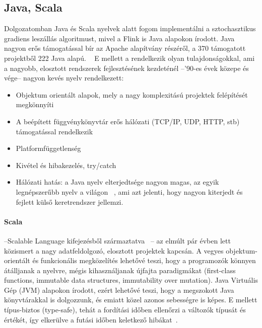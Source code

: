 \documentclass[a4paper,12pt]{article}
\begin{document}
\subsection{Java, Scala}
Dolgozatomban Java és Scala nyelvek alatt fogom implementálni a sztochasztikus gradiens leszállás algoritmust, mivel a Flink is Java alapokon írodott. Java nagyon erős támogatással bír az Apache alapítvány részéről, a 370 támogatott projektből 222 Java alapú. ~\cite{asf} E mellett a rendelkezik olyan tulajdonságokkal, ami a nagyobb, elosztott rendszerek fejlesztésének kezdeténél --'90-es évek közepe és vége-- nagyon kevés nyelv rendelkezett:
\begin{itemize}
\item Objektum orientált alapok, mely a nagy komplexitású projektek felépítését megkönnyíti
\item A beépített függvénykönyvtár erős hálózati (TCP/IP, UDP, HTTP, stb) támogatással rendelkezik
\item Platformfüggetlenség
\item Kivétel és hibakezelés, try/catch
\item Hálózati hatás: a Java nyelv elterjedtsége nagyon magas, az egyik legnépszerűbb nyelv a világon ~\cite{tiobe}, ami azt jelenti, hogy nagyon kiterjedt és fejlett külső keretrendszer jellemzi.
\end{itemize}

\paragraph{Scala}--Scalable Language kifejezésből származtatva ~\cite{odersky}-- az elmúlt pár évben lett közismert a nagy adatfeldolgozó, elosztott projektek kapcsán. A vegyes objektum-orientált és funkcionális megközelítés lehetővé teszi, hogy a programozók könnyen átálljanak a nyelvre, mégis kihasználjanak újfajta paradigmákat (first-class functions, immutable data structures, immutability over mutation). Java Virtuális Gép (JVM) alapokon írodott, ezért lehetővé teszi, hogy a megszokott Java könyvtárakkal is dolgozzunk, és emiatt közel azonos sebességre is képes.  E mellett típus-biztos (type-safe), tehát a fordítási időben ellenőrzi a változók típusát és értékét, így elkerülve a futási időben keletkező hibákat~\cite{toptal}. 
\end{document}
